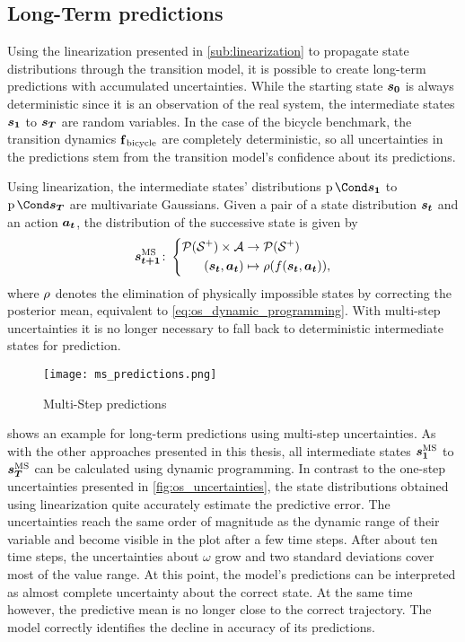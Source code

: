 \subsection{Long-Term predictions}
Using the linearization presented in \cref{sub:linearization} to propagate state distributions through the transition model, it is possible to create long-term predictions with accumulated uncertainties.
While the starting state $\bm{s_0}$ is always deterministic since it is an observation of the real system, the intermediate states $\bm{s_1}$ to $\bm{s_T}$ are random variables.
In the case of the bicycle benchmark, the transition dynamics $\operatorname{\operatorname{\mathbf{f}}_{\text{bicycle}}}$ are completely deterministic, so all uncertainties in the predictions stem from the transition model's confidence about its predictions.

Using linearization, the intermediate states' distributions $\Prob{\rv{s_1}}$ to $\Prob{\rv{s_T}}$ are multivariate Gaussians.
Given a pair of a state distribution $\bm{s_t}$ and an action $\bm{a_t}$, the distribution of the successive state is given by
\begin{align}
    \ms{\mat{s_{t+1}}} \colon \left\{
        \begin{aligned}
            \Dists(\Es^+) \times \Ah &\to \Dists(\Es^+) \\
            (\rv{s_t}, \mat{a_t}) &\mapsto \squeeze(f(\rv{s_t}, \mat{a_t})),
    \end{aligned}
    \right.
\end{align}
where $\squeeze$ denotes the elimination of physically impossible states by correcting the posterior mean, equivalent to \cref{eq:os_dynamic_programming}.
With multi-step uncertainties it is no longer necessary to fall back to deterministic intermediate states for prediction.

\begin{figure}[t]
    \centering
    \texttt{[image: ms\_predictions.png]}
    \caption{Multi-Step predictions}
    \label{fig:ms_predictions}
\end{figure}
 shows an example for long-term predictions using multi-step uncertainties.
As with the other approaches presented in this thesis, all intermediate states $\bm{s_1}^{\text{MS}}$ to $\bm{s_T}^{\text{MS}}$ can be calculated using dynamic programming.
In contrast to the one-step uncertainties presented in \cref{fig:os_uncertainties}, the state distributions obtained using linearization quite accurately estimate the predictive error.
The uncertainties reach the same order of magnitude as the dynamic range of their variable and become visible in the plot after a few time steps.
After about  ten time steps, the uncertainties about $\omega$ grow and two standard deviations cover most of the value range.
At this point, the model's predictions can be interpreted as almost complete uncertainty about the correct state.
At the same time however, the predictive mean is no longer close to the correct trajectory.
The model correctly identifies the decline in accuracy of its predictions.

